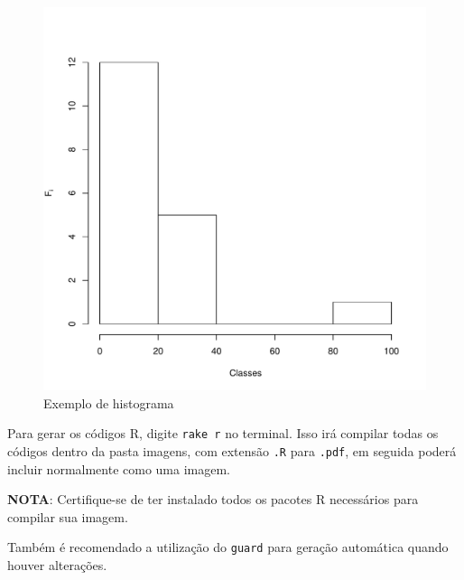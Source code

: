 \documentclass[
	12pt,				%
	oneside,			%
	a4paper,			%
	english,			%
	french,				%
	spanish,			%
	brazil				%
	]{abntex2}
\begin{document}
\begin{figure}[htbp]
\hypertarget{histograma}{%
\caption{Exemplo de histograma}\label{histograma}
\begin{center}
\includegraphics[scale=0.4]{imagens/R/historgrama.pdf}
\end{center}
}
\end{figure}

Para gerar os códigos R, digite \texttt{rake\ r} no terminal. Isso irá
compilar todas os códigos dentro da pasta imagens, com extensão
\texttt{.R} para \texttt{.pdf}, em seguida poderá incluir normalmente
como uma imagem.

\textbf{NOTA}: Certifique-se de ter instalado todos os pacotes R
necessários para compilar sua imagem.

Também é recomendado a utilização do \texttt{guard} para geração
automática quando houver alterações.
\end{document}
